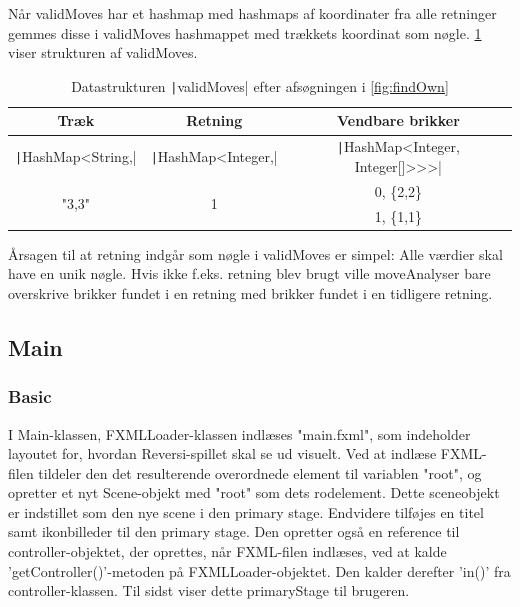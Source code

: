 Når validMoves har et hashmap med hashmaps af koordinater fra alle retninger gemmes disse i validMoves hashmappet med trækkets koordinat som nøgle. \cref{tbl:hashmaps} viser strukturen af validMoves.
\begin{table}[H]
    \centering
    \caption{Datastrukturen \texttt|validMoves| efter afsøgningen i \cref{fig:findOwn}}\label{tbl:hashmaps}
    \begin{tabular}{ccc}
        \toprule
        Træk                               & Retning                             & Vendbare brikker                                 \\
        \midrule
        \texttt|HashMap<String,| & \texttt|HashMap<Integer,| & \texttt|HashMap<Integer, Integer[]>>>| \\
        \multirow{2}{*}{"3,3"}             & \multirow{2}{*}{1}                  & 0, \{2,2\}                                       \\
                                           &                                     & 1, \{1,1\}                                       \\
        \bottomrule
    \end{tabular}
\end{table}
Årsagen til at retning indgår som nøgle i validMoves er simpel: Alle værdier skal have en unik nøgle. Hvis ikke f.eks. retning blev brugt ville moveAnalyser bare overskrive brikker fundet i en retning med brikker fundet i en tidligere retning.
\subsection{Main}

\subsubsection{Basic}\label{bm}
I Main-klassen, FXMLLoader-klassen indlæses "main.fxml", som indeholder layoutet for, hvordan Reversi-spillet skal se ud visuelt. Ved at indlæse FXML-filen tildeler den det resulterende overordnede element til variablen "root", og opretter et nyt Scene-objekt med "root" som dets rodelement. Dette sceneobjekt er indstillet som den nye scene i den primary stage. Endvidere tilføjes en titel samt ikonbilleder til den primary stage. Den opretter også en reference til controller-objektet, der oprettes, når FXML-filen indlæses, ved at kalde 'getController()'-metoden på FXMLLoader-objektet. Den kalder derefter 'in()' fra controller-klassen. Til sidst viser dette primaryStage til brugeren.


